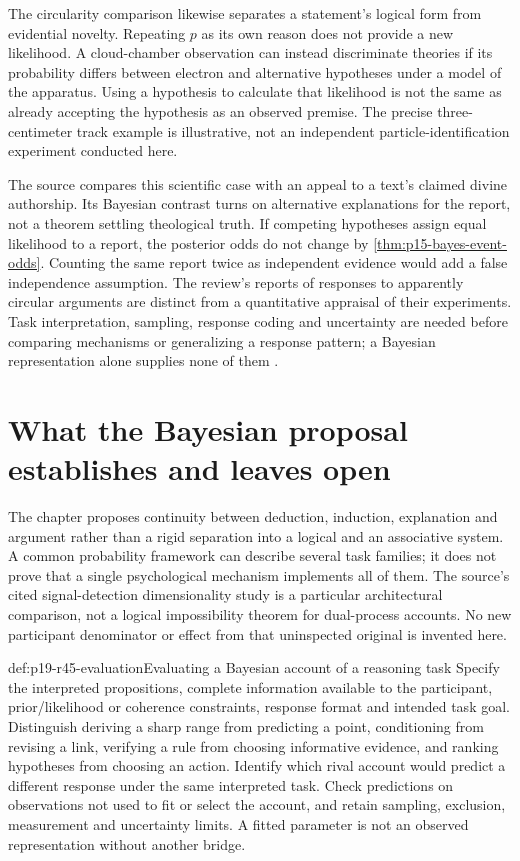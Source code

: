 The circularity comparison likewise separates a statement's logical
form from evidential novelty. Repeating \(p\) as its own reason
does not provide a new likelihood. A cloud-chamber observation can
instead discriminate theories if its probability differs between
electron and alternative hypotheses under a model of the apparatus.
Using a hypothesis to calculate that likelihood is not the same as
already accepting the hypothesis as an observed premise. The precise
three-centimeter track example is illustrative, not an independent
particle-identification experiment conducted here.

The source compares this scientific case with an appeal to a text's
claimed divine authorship. Its Bayesian contrast turns on alternative
explanations for the report, not a theorem settling theological truth.
If competing hypotheses assign equal likelihood to a report, the
posterior odds do not change by \cref{thm:p15-bayes-event-odds}.
Counting the same report twice as independent evidence would add a
false independence assumption. The review's reports of responses to
apparently circular arguments are distinct from a quantitative appraisal
of their experiments. Task interpretation, sampling, response coding and
uncertainty are needed before comparing mechanisms or generalizing a
response pattern; a Bayesian representation alone supplies none of them
\cite[pp.~291--292]{ChaterOaksford2021BayesianReasoning}.

\section{What the Bayesian proposal establishes and leaves open}
\label{sec:p19-r45-use}

The chapter proposes continuity between deduction, induction,
explanation and argument rather than a rigid separation into a logical
and an associative system. A common probability framework can describe
several task families; it does not prove that a single psychological
mechanism implements all of them. The source's cited signal-detection
dimensionality study is a particular architectural comparison, not a
logical impossibility theorem for dual-process accounts. No new
participant denominator or effect from that uninspected original is
invented here.

\begin{hbmethod}{def:p19-r45-evaluation}{Evaluating a Bayesian account of a reasoning task}
Specify the interpreted propositions, complete information available
to the participant, prior/likelihood or coherence constraints, response
format and intended task goal. Distinguish deriving a sharp range from
predicting a point, conditioning from revising a link, verifying a rule
from choosing informative evidence, and ranking hypotheses from
choosing an action. Identify which rival account would predict a
different response under the same interpreted task. Check predictions
on observations not used to fit or select the account, and retain
sampling, exclusion, measurement and uncertainty limits. A fitted
parameter is not an observed representation without another bridge.
\end{hbmethod}

